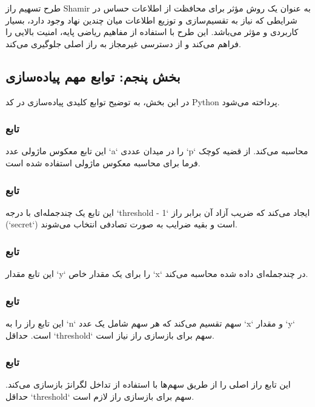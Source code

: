 \documentclass{report}
\begin{document}
 طرح تسهیم راز Shamir به عنوان یک روش مؤثر برای محافظت از اطلاعات حساس در شرایطی که نیاز به تقسیم‌سازی و توزیع اطلاعات میان چندین نهاد وجود دارد، بسیار کاربردی و مؤثر می‌باشد. این طرح با استفاده از مفاهیم ریاضی پایه، امنیت بالایی را فراهم می‌کند و از دسترسی غیرمجاز به راز اصلی جلوگیری می‌کند.

 \subsection*{بخش پنجم: توابع مهم پیاده‌سازی}
 در این بخش، به توضیح توابع کلیدی پیاده‌سازی در کد Python پرداخته می‌شود.

 \subsubsection*{تابع }
 این تابع معکوس ماژولی عدد `a` را در میدان عددی `p` محاسبه می‌کند. از قضیه کوچک فرما برای محاسبه معکوس ماژولی استفاده شده است.

 \subsubsection*{تابع }
 این تابع یک چندجمله‌ای با درجه `threshold - 1` ایجاد می‌کند که ضریب آزاد آن برابر راز (`secret`) است و بقیه ضرایب به صورت تصادفی انتخاب می‌شوند.

 \subsubsection*{تابع }
 این تابع مقدار `y` را برای یک مقدار خاص `x` در چندجمله‌ای داده شده محاسبه می‌کند.

 \subsubsection*{تابع }
 این تابع راز را به `n` سهم تقسیم می‌کند که هر سهم شامل یک عدد `x` و مقدار `y` است. حداقل `threshold` سهم برای بازسازی راز نیاز است.

 \subsubsection*{تابع }
 این تابع راز اصلی را از طریق سهم‌ها با استفاده از تداخل لگرانژ بازسازی می‌کند. حداقل `threshold` سهم برای بازسازی راز لازم است.
\end{document}

